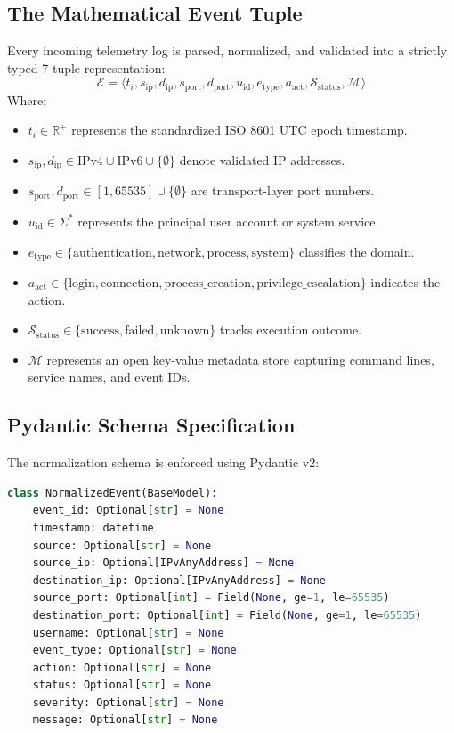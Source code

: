 \documentclass[11pt,a4paper]{article}
\begin{document}
\subsection{The Mathematical Event Tuple}
Every incoming telemetry log is parsed, normalized, and validated into a strictly typed 7-tuple representation:
\begin{equation}
\mathcal{E} = \langle t_i, s_{\text{ip}}, d_{\text{ip}}, s_{\text{port}}, d_{\text{port}}, u_{\text{id}}, e_{\text{type}}, a_{\text{act}}, \mathcal{S}_{\text{status}}, \mathcal{M} \rangle
\end{equation}
Where:
\begin{itemize}
    \item $t_i \in \mathbb{R}^+$ represents the standardized ISO 8601 UTC epoch timestamp.
    \item $s_{\text{ip}}, d_{\text{ip}} \in \text{IPv4} \cup \text{IPv6} \cup \{\emptyset\}$ denote validated IP addresses.
    \item $s_{\text{port}}, d_{\text{port}} \in [1, 65535] \cup \{\emptyset\}$ are transport-layer port numbers.
    \item $u_{\text{id}} \in \Sigma^*$ represents the principal user account or system service.
    \item $e_{\text{type}} \in \{\text{authentication}, \text{network}, \text{process}, \text{system}\}$ classifies the domain.
    \item $a_{\text{act}} \in \{\text{login}, \text{connection}, \text{process\_creation}, \text{privilege\_escalation}\}$ indicates the action.
    \item $\mathcal{S}_{\text{status}} \in \{\text{success}, \text{failed}, \text{unknown}\}$ tracks execution outcome.
    \item $\mathcal{M}$ represents an open key-value metadata store capturing command lines, service names, and event IDs.
\end{itemize}

\subsection{Pydantic Schema Specification}
The normalization schema is enforced using Pydantic v2:
\begin{lstlisting}[language=Python]
class NormalizedEvent(BaseModel):
    event_id: Optional[str] = None
    timestamp: datetime
    source: Optional[str] = None
    source_ip: Optional[IPvAnyAddress] = None
    destination_ip: Optional[IPvAnyAddress] = None
    source_port: Optional[int] = Field(None, ge=1, le=65535)
    destination_port: Optional[int] = Field(None, ge=1, le=65535)
    username: Optional[str] = None
    event_type: Optional[str] = None
    action: Optional[str] = None
    status: Optional[str] = None
    severity: Optional[str] = None
    message: Optional[str] = None
\end{lstlisting}
\end{document}
